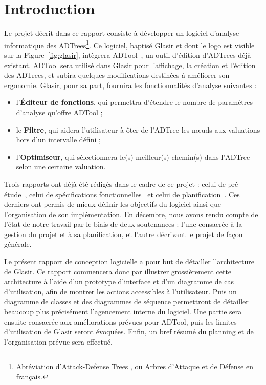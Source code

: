 \section{Introduction}
    \label{sec:intro}

    Le projet décrit dans ce rapport consiste à développer un logiciel d'analyse informatique des ADTrees\footnote{Abréviation d'\og Attack-Defense Trees \fg{}, ou \og Arbres d'Attaque et de Défense\fg{} en français.}. Ce logiciel, baptisé Glasir et dont le logo est visible sur la {\sc Figure}~\ref{fig:glasir}, intègrera ADTool~\cite{ADTool}, un outil d'édition d'ADTrees déjà existant. ADTool sera utilisé dans Glasir pour l'affichage, la création et l'édition des ADTrees, et subira quelques modifications destinées à améliorer son ergonomie. Glasir, pour sa part, fournira les fonctionnalités d'analyse suivantes :

    \begin{itemize}
    	\item l'{\bf Éditeur de fonctions}, qui permettra d'étendre le nombre de paramètres d'analyse qu'offre ADTool ;
    	\item le {\bf Filtre}, qui aidera l'utilisateur à ôter de l'ADTree les nœuds aux valuations hors d'un intervalle défini ;
    	\item l'{\bf Optimiseur}, qui sélectionnera le(s) meilleur(s) chemin(s) dans l'ADTree selon une certaine valuation.
    \end{itemize} 

    Trois rapports ont déjà été rédigés dans le cadre de ce projet : celui de pré-étude~\cite{pre_etude}, celui de spécifications fonctionnelles~\cite{spec_fonc} et celui de planification~\cite{planif}. Ces derniers ont permis de mieux définir les objectifs du logiciel ainsi que l'organisation de son implémentation. En décembre, nous avons rendu compte de l'état de notre travail par le biais de deux soutenances : l'une consacrée à la gestion du projet et à sa planification, et l'autre décrivant le projet de façon générale. 

    Le présent rapport de conception logicielle a pour but de détailler l'architecture de Glasir. Ce rapport commencera donc par illustrer grossièrement cette architecture à l'aide d'un prototype d'interface et d'un diagramme de cas d'utilisation, afin de montrer les actions accessibles à l'utilisateur. Puis un diagramme de classes et des diagrammes de séquence permettront de détailler beaucoup plus précisément l'agencement interne du logiciel. Une partie sera ensuite consacrée aux améliorations prévues pour ADTool, puis les limites d'utilisation de Glasir seront évoquées. Enfin, un bref résumé du planning et de l'organisation prévue sera effectué.

